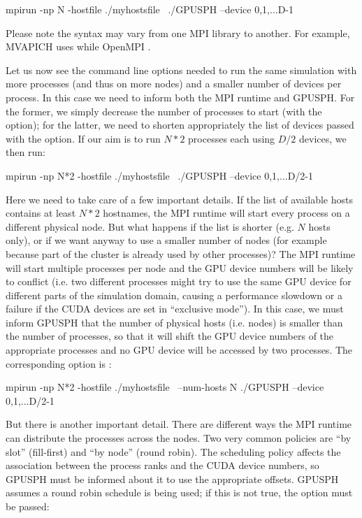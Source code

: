 \documentclass{../GPUSPHtemplate}
\begin{document}
\begin{shellcode}
mpirun -np N -hostfile ./myhostsfile \
./GPUSPH --device 0,1,...D-1
\end{shellcode}

Please note the syntax may vary from one MPI library to another. 
For example, MVAPICH uses \cmd{-hostfile} while OpenMPI .

Let us now see the command line options needed to run the same simulation 
with more processes (and thus on more nodes) and a smaller number of devices per process. 
In this case we need to inform both the MPI runtime and GPUSPH. 
For the former, we simply decrease the number of processes to start (with the  option); 
for the latter, we need to shorten appropriately the list of devices 
passed with the \cmd{--device} option. 
If our aim is to run $N*2$ processes each using $D/2$ devices, we then run:
\begin{shellcode}
mpirun -np N*2 -hostfile ./myhostsfile \
./GPUSPH --device 0,1,...D/2-1
\end{shellcode}

Here we need to take care of a few important details. If the list of available 
hosts contains at least $N*2$ hostnames, the MPI runtime will start every process 
on a different physical node. But what happens if the list is shorter 
(e.g. $N$ hosts only), or if we want anyway to use a smaller number of 
nodes (for example because part of the cluster is already used by other processes)? 
The MPI runtime will start multiple processes per node and the GPU device 
numbers will be likely to conflict (i.e. two different processes might 
try to use the same GPU device for different parts of the simulation domain, 
causing a performance slowdown or a failure if the CUDA devices are set
in ``exclusive mode''). 
In this case, we must inform GPUSPH that the number of physical hosts (i.e. nodes) 
is smaller than the number of processes, so that it will shift the GPU device 
numbers of the appropriate processes and no GPU device will be accessed by two processes. 
The corresponding option is \cmd{--num-hosts}:

\begin{shellcode}
mpirun -np N*2 -hostfile ./myhostsfile \
--num-hosts N ./GPUSPH --device 0,1,...D/2-1
\end{shellcode}

But there is another important detail. There are different ways the MPI 
runtime can distribute the processes across the nodes. 
Two very common policies are ``by slot'' (fill-first) and ``by node''
(round robin). 
The scheduling policy affects the association between the process ranks 
and the CUDA device numbers, so GPUSPH must be informed about it to use 
the appropriate offsets. GPUSPH assumes a round robin schedule is being used; 
if this is not true, the \cmd{--byslot-scheduling} option must be passed:
\end{document}
